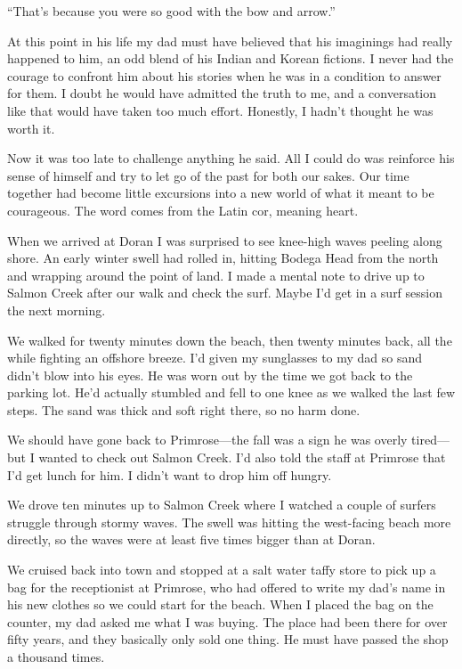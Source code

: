 \documentclass[12pt]{book}
\begin{document}
``That's because you were so good with the bow and arrow.''

At this point in his life my dad must have believed that his imaginings had really happened to him, an odd blend of his Indian and Korean fictions. I never had the courage to confront him about his stories when he was in a condition to answer for them. I doubt he would have admitted the truth to me, and a conversation like that would have taken too much effort. Honestly, I hadn't thought he was worth it.

Now it was too late to challenge anything he said. All I could do was reinforce his sense of himself and try to let go of the past for both our sakes. Our time together had become little excursions into a new world of what it meant to be courageous. The word comes from the Latin cor, meaning heart.

When we arrived at Doran I was surprised to see knee-high waves peeling along shore. An early winter swell had rolled in, hitting Bodega Head from the north and wrapping around the point of land. I made a mental note to drive up to Salmon Creek after our walk and check the surf. Maybe I'd get in a surf session the next morning.

We walked for twenty minutes down the beach, then twenty minutes back, all the while fighting an offshore breeze. I'd given my sunglasses to my dad so sand didn't blow into his eyes. He was worn out by the time we got back to the parking lot. He'd actually stumbled and fell to one knee as we walked the last few steps. The sand was thick and soft right there, so no harm done.

We should have gone back to Primrose---the fall was a sign he was overly tired---but I wanted to check out Salmon Creek. I'd also told the staff at Primrose that I'd get lunch for him. I didn't want to drop him off hungry.

We drove ten minutes up to Salmon Creek where I watched a couple of surfers struggle through stormy waves. The swell was hitting the west-facing beach more directly, so the waves were at least five times bigger than at Doran.

We cruised back into town and stopped at a salt water taffy store to pick up a bag for the receptionist at Primrose, who had offered to write my dad's name in his new clothes so we could start for the beach. When I placed the bag on the counter, my dad asked me what I was buying. The place had been there for over fifty years, and they basically only sold one thing. He must have passed the shop a thousand times.
\end{document}
